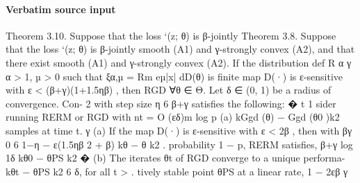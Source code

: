 \documentclass[10pt]{article}
\begin{document}
\paragraph{Verbatim source input}
\begin{ReviewVerbatim}
Theorem 3.10. Suppose that the loss `(z; θ) is β-jointly
Theorem 3.8. Suppose that the loss `(z; θ) is β-jointly                       smooth (A1) and γ-strongly convex (A2), and that there exist
smooth (A1) and γ-strongly convex (A2). If the distribution                                                def R        α
                                        γ                                     α > 1, µ > 0 such that ξα,µ = Rm eµ|x| dD(θ) is ﬁnite
map D(·) is ε-sensitive with ε < (β+γ)(1+1.5ηβ) , then RGD
                                                                              ∀θ ∈ Θ. Let δ ∈ (0, 1) be a radius of convergence.     Con-
                     2
with step size η 6 β+γ satisﬁes the following:
                                                                                                                                    � t
                                                                                                                            1
                                                                              sider running RERM or RGD with nt = O (εδ)m log p
(a) kGgd (θ) − Ggd (θ0 )k2                                                    samples at time t.
                                                                                                                            γ
                                                                              (a) If the map D(·) is ε-sensitive with ε < 2β  , then with
                         βγ                                          0
      6       1−η           − ε(1.5ηβ 2 + β)             kθ − θ k2 .              probability 1 − p, RERM satisﬁes,
                        β+γ
                                                                                                                  log 1δ kθ0 − θPS k2
                                                                                                                     �
(b) The iterates θt of RGD converge to a unique performa-                           kθt − θPS k2 6 δ, for all t >                       .
    tively stable point θPS at a linear rate,                                                                           1 − 2εβ
                                                                                                                              γ


\end{ReviewVerbatim}
\end{document}
